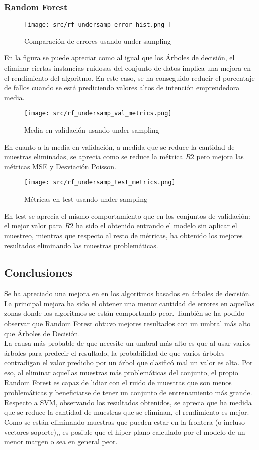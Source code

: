 \subsubsection*{Random Forest}
\begin{figure}[H]
	\centering
	\texttt{[image: src/rf\_undersamp\_error\_hist.png ]}
	\caption{Comparación de errores usando under-sampling}
	\label{fig:cmp_error_rf}
\end{figure}
En la figura se puede apreciar como al igual que los Árboles de decisión, el eliminar ciertas instancias ruidosas del conjunto de datos implica una mejora en el rendimiento del algoritmo. En este caso, se ha conseguido reducir el porcentaje de fallos cuando se está prediciendo valores altos de intención emprendedora media.
\begin{figure}[H]
	\centering
	\texttt{[image: src/rf\_undersamp\_val\_metrics.png]}
	\caption{Media en validación usando under-sampling}
	\label{fig:cmp_val_rf}
\end{figure}
En cuanto a la media en validación, a medida que se reduce la cantidad de muestras eliminadas, se aprecia como se reduce la métrica $R2$ pero mejora las métricas MSE y Desviación Poisson.
\begin{figure}[H]
	\centering
	\texttt{[image: src/rf\_undersamp\_test\_metrics.png]}
	\caption{Métricas en test usando under-sampling}
	\label{fig:cmp_test_rf}
\end{figure}
En test se aprecia el mismo comportamiento que en los conjuntos de validación: el mejor valor para $R2$ ha sido el obtenido entrando el modelo sin aplicar el  muestreo, mientras que respecto al resto de métricas, ha obtenido los mejores resultados eliminando las muestras problemáticas.\\
\subsection{Conclusiones}
Se ha apreciado una mejora en en los algoritmos basados en árboles de decisión. La principal mejora ha sido el obtener una menor cantidad de errores en aquellas zonas donde los algoritmos se están comportando peor. También se ha podido observar que Random Forest obtuvo mejores resultados con un umbral más alto que Árboles de Decisión. \\
La causa más probable de que necesite un umbral más alto es que al usar varios árboles para predecir el resultado, la probabilidad de que varios árboles contradigan el valor predicho por un árbol que clasificó mal un valor es alta. Por eso, al eliminar aquellas muestras más problemáticas del conjunto, el propio Random Forest es capaz de lidiar con el ruido de muestras que son menos problemáticas y beneficiarse de tener un conjunto de entrenamiento más grande.\\
\linebreak
Respecto a SVM, observando los resultados obtenidos, se aprecia que ha medida que se reduce la cantidad de muestras que se eliminan, el rendimiento es mejor.
Como se están eliminando muestras que pueden estar en la frontera (o incluso vectores soporte),, es posible que el hiper-plano calculado por el modelo de un menor margen o sea en general peor.
